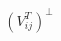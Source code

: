 \documentclass[preview]{standalone}
\begin{document}
\begin{align*}
(V_{ij}^T)^{\perp}
\end{align*}
\end{document}
